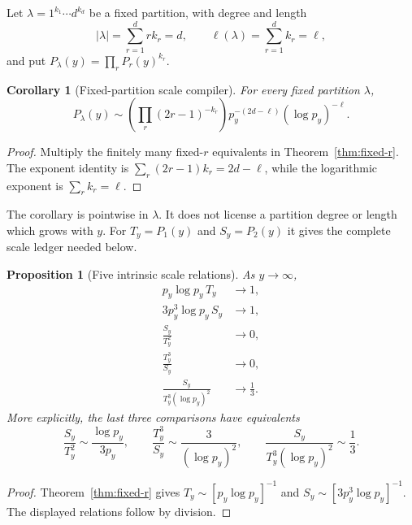\documentclass[11pt]{article}
\newtheorem{proposition}[theorem]{Proposition}
\newtheorem{corollary}[theorem]{Corollary}
\theoremstyle{definition}
\theoremstyle{remark}
\begin{document}
Let $\lambda=1^{k_1}\cdots d^{k_d}$ be a fixed partition, with degree and
length
\[
 |\lambda|=\sum_{r=1}^d rk_r=d,
 \qquad \ell(\lambda)=\sum_{r=1}^d k_r=\ell,
\]
and put $P_\lambda(y)=\prod_rP_r(y)^{k_r}$.

\begin{corollary}[Fixed-partition scale compiler]
\label{cor:partition}
For every fixed partition $\lambda$,
\begin{equation}
 \boxed{
 P_\lambda(y)\sim
 \left(\prod_r(2r-1)^{-k_r}\right)
 p_y^{-(2d-\ell)}(\log p_y)^{-\ell}.}
 \label{eq:partition}
\end{equation}
\end{corollary}

\begin{proof}
Multiply the finitely many fixed-$r$ equivalents in
Theorem~\ref{thm:fixed-r}.  The exponent identity is
$\sum_r(2r-1)k_r=2d-\ell$, while the logarithmic exponent is
$\sum_rk_r=\ell$.
\end{proof}

The corollary is pointwise in $\lambda$.  It does not license a partition
degree or length which grows with $y$.  For $T_y=P_1(y)$ and
$S_y=P_2(y)$ it gives the complete scale ledger needed below.

\begin{proposition}[Five intrinsic scale relations]
\label{prop:scales}
As $y\to\infty$,
\begin{align}
 p_y\log p_y\,T_y&\longrightarrow1,
 \label{eq:scale1}\\
 3p_y^3\log p_y\,S_y&\longrightarrow1,
 \label{eq:scale2}\\
 \frac{S_y}{T_y^2}&\longrightarrow0,
 \label{eq:scale3}\\
 \frac{T_y^3}{S_y}&\longrightarrow0,
 \label{eq:scale4}\\
 \frac{S_y}{T_y^3(\log p_y)^2}&\longrightarrow\frac13.
 \label{eq:scale5}
\end{align}
More explicitly, the last three comparisons have equivalents
\[
 \frac{S_y}{T_y^2}\sim\frac{\log p_y}{3p_y},\qquad
 \frac{T_y^3}{S_y}\sim\frac{3}{(\log p_y)^2},\qquad
 \frac{S_y}{T_y^3(\log p_y)^2}\sim\frac13.
\]
\end{proposition}

\begin{proof}
Theorem~\ref{thm:fixed-r} gives
$T_y\sim[p_y\log p_y]^{-1}$ and
$S_y\sim[3p_y^3\log p_y]^{-1}$.  The displayed relations follow by
division.
\end{proof}
\end{document}
